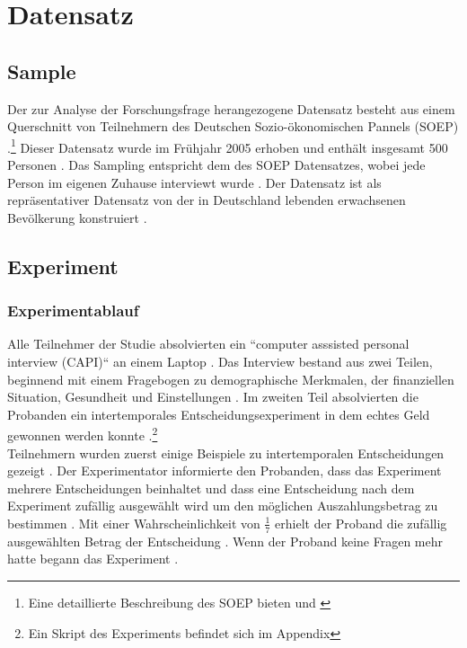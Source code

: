 \documentclass[11pt,a4paper]{article}
\begin{document}
\section{Datensatz}
\subsection{Sample}
Der zur Analyse der Forschungsfrage herangezogene Datensatz besteht aus einem Querschnitt von Teilnehmern des Deutschen Sozio-ökonomischen Pannels (SOEP) \parencite{dohmen2012interpreting}.\footnote{Eine detaillierte Beschreibung des SOEP bieten \textcite{schupp2002maintenance} und \textcite{wagner2006enhancing}} Dieser Datensatz wurde im Frühjahr 2005 erhoben und enthält insgesamt 500 Personen \parencite{dohmen2012interpreting}. Das Sampling entspricht dem des SOEP Datensatzes, wobei jede Person im eigenen Zuhause interviewt wurde \parencite{dohmen2012interpreting}. Der Datensatz ist als repräsentativer Datensatz von der in Deutschland lebenden erwachsenen Bevölkerung konstruiert \parencite{dohmen2012interpreting}. 

\subsection{Experiment}
\subsubsection{Experimentablauf}
Alle Teilnehmer der Studie absolvierten ein “computer asssisted personal interview (CAPI)“ an einem Laptop \parencite{dohmen2012interpreting}. Das Interview bestand aus zwei Teilen, beginnend mit einem Fragebogen zu demographische Merkmalen, der finanziellen Situation, Gesundheit und Einstellungen \parencite{dohmen2012interpreting}. Im zweiten Teil absolvierten die Probanden ein intertemporales Entscheidungsexperiment in dem echtes Geld gewonnen werden konnte \parencite{dohmen2012interpreting}.\footnote{Ein Skript des Experiments befindet sich im Appendix}\\

Teilnehmern wurden zuerst einige Beispiele zu intertemporalen Entscheidungen gezeigt \parencite{dohmen2012interpreting}. Der Experimentator informierte den Probanden, dass das Experiment mehrere Entscheidungen beinhaltet und dass eine Entscheidung nach dem Experiment zufällig ausgewählt wird um den möglichen Auszahlungsbetrag zu bestimmen \parencite{dohmen2012interpreting}. Mit einer Wahrscheinlichkeit von $\frac{1}{7}$ erhielt der Proband die zufällig ausgewählten Betrag der Entscheidung \parencite{dohmen2012interpreting}. Wenn der Proband keine Fragen mehr hatte begann das Experiment \parencite{dohmen2012interpreting}. %
\end{document}
